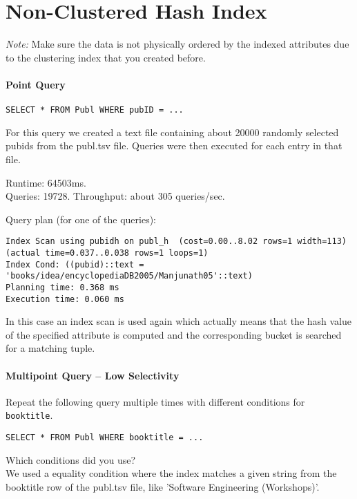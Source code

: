 \documentclass[11pt]{scrartcl}
\begin{document}
\section{Non-Clustered Hash Index}

\noindent \emph{Note:} Make sure the data is not physically ordered by
the indexed attributes due to the clustering index that you created
before.

\paragraph{Point Query}

{\small
\begin{verbatim}
SELECT * FROM Publ WHERE pubID = ...
\end{verbatim}
}

\noindent
For this query we created a text file containing about 20000 randomly selected pubids from the publ.tsv file. Queries were then executed for each entry in that file.

\smallskip\noindent
Runtime: 64503ms. \\
Queries: 19728.
Throughput: about 305 queries/sec.

\smallskip\noindent
Query plan (for one of the queries):
{\small
\begin{verbatim}
Index Scan using pubidh on publ_h  (cost=0.00..8.02 rows=1 width=113) (actual time=0.037..0.038 rows=1 loops=1)
Index Cond: ((pubid)::text = 'books/idea/encyclopediaDB2005/Manjunath05'::text)
Planning time: 0.368 ms
Execution time: 0.060 ms
\end{verbatim}
In this case an index scan is used again which actually means that the hash value of the specified attribute is computed
and the corresponding bucket is searched for a matching tuple.
}


\paragraph{Multipoint Query -- Low Selectivity}

Repeat the following query multiple times with different conditions for {\tt booktitle}.

{\small
\begin{verbatim}
SELECT * FROM Publ WHERE booktitle = ...
\end{verbatim}
}

\noindent
Which conditions did you use?\\
We used a equality condition where the index matches a given string from the booktitle row of the publ.tsv file, like 'Software Engineering (Workshops)'.
\end{document}
